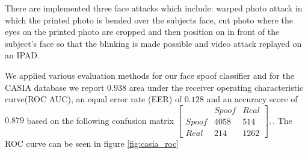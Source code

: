 There are implemented three face attacks which include: warped photo attack in which the printed photo is bended over the subjects face, cut photo where the eyes on the printed photo are cropped and then position on in front of the subject's face so that the blinking is made possible and video attack replayed on an IPAD.

We applied various evaluation methods for our face spoof classifier and for the CASIA database we report $0.938$ area under the receiver operating characteristic curve(ROC AUC), an equal error rate (EER) of $0.128$ and an accuracy score of $0.879$ based on the following confusion matrix
$
[
\begin{smallmatrix}
&Spoof & Real\\
Spoof & 4058 & 514\\
Real & 214 & 1262
\end{smallmatrix}], 
$. The ROC curve can be seen in figure \ref{fig:casia_roc}
